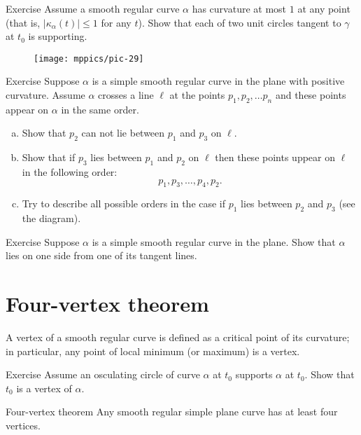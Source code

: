 \begin{thm}{Exercise} Assume a smooth regular curve $\alpha$ has curvature at most $1$ at any point (that is, $|\kappa_\alpha(t)|\le 1$ for any $t$).
Show that each of two unit circles tangent to $\gamma$ at $t_0$ is supporting. 
\end{thm}

\begin{figure}[h!]
\vskip-0mm
\centering
\texttt{[image: mppics/pic-29]}
\vskip0mm
\end{figure}

\begin{thm}{Exercise}
Suppose $\alpha$ is a simple smooth regular curve in the plane with positive curvature.
Assume $\alpha$ crosses a line $\ell$ at the points $p_1,p_2,\dots p_n$ and these points appear on $\alpha$ in the same order.
\begin{enumerate}[(a)]
\item Show that $p_2$ can not lie between $p_1$ and $p_3$ on $\ell$.
\item Show that if $p_3$ lies between $p_1$ and $p_2$ on $\ell$ then these points uppear on $\ell$ in the following order:  
\[p_1,p_3,\dots,p_4 ,p_2.\]
\item Try to describe all possible orders in the case if $p_1$ lies between $p_2$ and $p_3$ (see the diagram).
\end{enumerate}
\end{thm}

\begin{thm}{Exercise}
Suppose $\alpha$ is a simple smooth regular curve in the plane.
Show that $\alpha$ lies on one side from one of its tangent lines. 
\end{thm}



\section{Four-vertex theorem}



A vertex of a smooth regular curve is defined as a critical point of its curvature;
in particular, any point of local minimum (or maximum) is a vertex.

\begin{thm}{Exercise}
Assume an osculating circle of curve $\alpha$ at $t_0$ supports $\alpha$ at $t_0$.
Show that $t_0$ is a vertex of $\alpha$.
\end{thm}

\begin{thm}{Four-vertex theorem}
Any smooth regular simple plane curve has at least four
vertices.
\end{thm}

